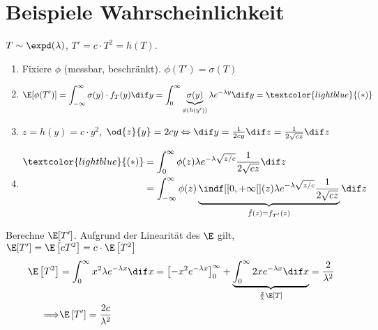 \section{Beispiele Wahrscheinlichkeit}%
\label{sec:beispiele_wahrscheinlichkeit}

\begin{example}
	$T \sim \expd (\lambda)$, $T' = c \cdot T^2 = h(T)$.
	\begin{enumerate}
		\item Fixiere $\phi$ (messbar, beschränkt). $\phi(T') = \sigma (T)$
		\item \begin{equation*}
				\E [\phi (T')] = \int_{- \infty}^{\infty} \sigma(y) \cdot f_T (y) \dif y = \int_{0}^{\infty}
				\underbrace{\sigma(y)}_{\phi(h(y'))} \lambda e^{-\lambda y} \dif y = \textcolor{lightblue}{(*)}
		\end{equation*}
		\item $z = h(y) = c \cdot y^2$, $\od{z}{y} = 2 cy \Leftrightarrow \dif y = \frac{1}{2cy} \dif z = \frac{1}{2
			\sqrt{cz}} \dif z $
		\item \begin{align*}
				\textcolor{lightblue}{(*)} &= \int_{0}^{\infty} \phi (z) \lambda e^{-\lambda \sqrt{z/c}} \frac{1}{2
					\sqrt{cz}} \dif z \\
													&= \int_{- \infty}^{\infty} \phi (z) \underbrace{\indf[{[0, + \infty[}] (z) 
													\lambda e^{-\lambda \sqrt{z/c}} \frac{1}{2 \sqrt{cz}}}_{\tilde{f}(z) = f_{T'} (z)}\dif z
		\end{align*}
	\end{enumerate}
	\tcblower
	Berechne $\E [T']$. \hspace{10mm} Aufgrund der  Linearität des $\E$ gilt, $\E[T'] = \E \left[ c T^2 \right] = c \cdot
	\E \left[ T^2 \right]$
	\begin{align*}
		\E \left[ T^2 \right] &= \int_{0}^{\infty} x^2 \lambda e^{-\lambda x} \dif x = \left[ -x^2 e^{-\lambda x}
		\right]_0^\infty + \underbrace{\int_{0}^{\infty} 2x e^{-\lambda x} \dif x}_{\frac{2}{\lambda} \E[T]} = \frac{2}{\lambda^2} \\
			\Longrightarrow & \E\left[T'\right] = \frac{2c}{\lambda^2}
	\end{align*}
\end{example}
